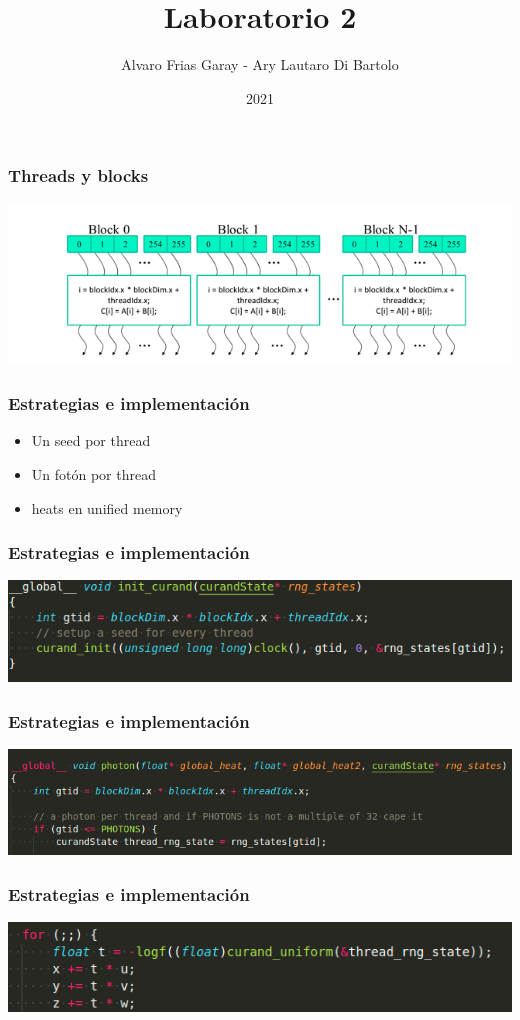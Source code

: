\documentclass{beamer}
\title{Laboratorio 2}
\author{Alvaro Frias Garay - Ary Lautaro Di Bartolo}
\institute{Universidad Nacional de Córdoba - Universidad Nacional de Cuyo}
\date{2021}
\begin{document}
\frame{\titlepage}

\begin{frame}
    \frametitle{Threads y blocks}
    \includegraphics[width=\textwidth]{imagenes/graf_threads_blocks.png}
\end{frame}

\begin{frame}
    \frametitle{Estrategias e implementación}
    \begin{itemize}
        \item Un seed por thread
        \item Un fotón por thread
        \item heats en unified memory
    \end{itemize}
\end{frame}

\begin{frame}
    \frametitle{Estrategias e implementación}
    \includegraphics[width=\textwidth]{imagenes/code1.png}
\end{frame}

\begin{frame}
    \frametitle{Estrategias e implementación}
    \includegraphics[width=\textwidth]{imagenes/code2.png}

\end{frame}

\begin{frame}
    \frametitle{Estrategias e implementación}
    \includegraphics[width=\textwidth]{imagenes/code3.png}

\end{frame}
\end{document}
